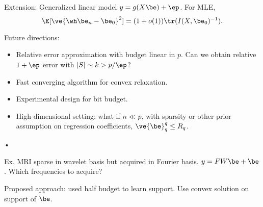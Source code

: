 
Extension: Generalized linear model $y=g(X\be) +\ep$. For MLE, 
$$
\E[ \ve{\wh \be_n - \be _0}^2] = (1+o(1)) \tr(I(X,\be_0)^{-1}). 
$$

Future directions:
\begin{itemize}
\item
Relative error approximation with budget linear in $p$.  Can we obtain relative $1+\ep$ error with $|S|\sim k>p/\ep$?
\item
Fast converging algorithm for convex relaxation.
\item
Experimental design for bit budget. 
\item
High-dimensional setting: what if $n\ll p$, with sparsity or other prior assumption on regression coefficients, $\ve{\be}_q^q\le R_q$. 
\end{itemize}•

Ex. MRI sparse in wavelet basis but acquired in Fourier basis. $y=FW\be + \be$. Which frequencies to acquire? 

Proposed approach: used half budget to learn support. Use convex solution on support of $\be$. 

